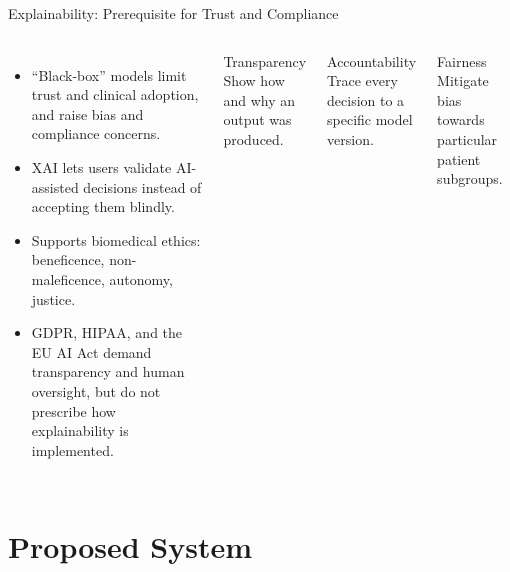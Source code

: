 \documentclass[
aspectratio=169,	%
english,			%
]{DEEclassP}
\begin{document}
\begin{frame}{Explainability: Prerequisite for Trust and Compliance}

\begin{columns}[t]
\small
\setlstep{0.2cm}{0cm}{0cm}
\begin{itemize}
	\item ``Black-box'' models limit trust and clinical adoption, and raise bias and compliance concerns.
	\item XAI lets users \alert{validate} AI-assisted decisions instead of accepting them blindly.
	\item Supports biomedical ethics: beneficence, non-maleficence, autonomy, justice.
	\item GDPR, HIPAA, and the EU AI Act demand transparency and human oversight, but \alert{do not prescribe} how explainability is implemented.
\end{itemize}

\begin{block}{Transparency}
\small Show how and why an output was produced.
\end{block}
\begin{block}{Accountability}
\small Trace every decision to a specific model version.
\end{block}
\begin{block}{Fairness}
\small Mitigate bias towards particular patient subgroups.
\end{block}
\end{columns}

\end{frame}

\section{Proposed System}
\end{document}
